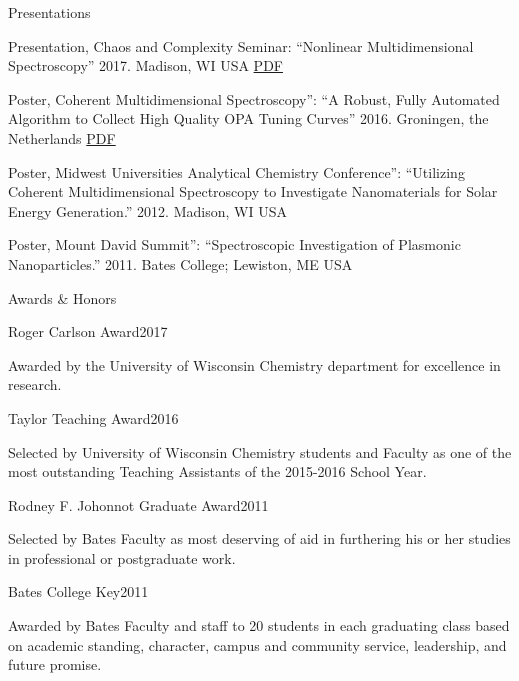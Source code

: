 \documentclass{resume}  %
\begin{document}
\begin{rSection}{Presentations}
  \begin{etaremune}[leftmargin = 1.75 em]
    \item Presentation, Chaos and Complexity Seminar:
      ``Nonlinear Multidimensional Spectroscopy''
      2017. Madison, WI USA
      \href{https://github.com/untzag/CV/raw/master/supplementary/2017-11-07\%20chaos.pdf}{PDF}
    \item Poster, Coherent Multidimensional Spectroscopy'':
      ``A Robust, Fully Automated Algorithm to Collect High Quality OPA Tuning Curves''
      2016. Groningen, the Netherlands
      \href{https://github.com/untzag/CV/raw/master/supplementary/2016-06-01\%20CMDS.pdf}{PDF}
    \item Poster, Midwest Universities Analytical Chemistry Conference'':
      ``Utilizing Coherent Multidimensional Spectroscopy to Investigate Nanomaterials for Solar Energy
      Generation.''
      2012. Madison, WI USA
    \item Poster, Mount David Summit'':
      ``Spectroscopic Investigation of Plasmonic Nanoparticles.''
      2011. Bates College; Lewiston, ME USA
  \end{etaremune}
\end{rSection}

\begin{rSection}{Awards \& Honors}
  \begin{rSubsection}{Roger Carlson Award}{2017}{}{}
	  \item Awarded by the University of Wisconsin Chemistry department for excellence in research.
  \end{rSubsection}
  \begin{rSubsection}{Taylor Teaching Award}{2016}{}{}
    \item  Selected by University of Wisconsin Chemistry students and Faculty as one of the most
      outstanding Teaching Assistants of the 2015-2016 School Year.
  \end{rSubsection}
  \begin{rSubsection}{Rodney F. Johonnot Graduate Award}{2011}{}{}
    \item  Selected by Bates Faculty as most deserving of aid in furthering his or her studies in
      professional or postgraduate work.
  \end{rSubsection}
  \begin{rSubsection}{Bates College Key}{2011}{}{}
    \item Awarded by Bates Faculty and staff to 20 students in each graduating class based on
      academic standing, character, campus and community service, leadership, and future promise.
  \end{rSubsection}
\end{rSection}
\end{document}
